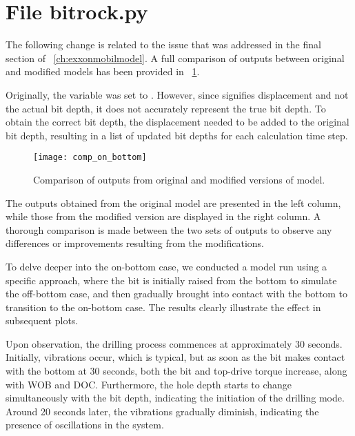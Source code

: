 \section{File {\codefont bitrock.py}}
The following change is related to the issue that was addressed in the final section of \chaptername~\ref{ch:exxonmobilmodel}.
A full comparison of outputs between original and modified models has been provided in \figurename~\ref{Comaprison_on_bottom}.
\begin{codemodifications}

\begin{codemodification}{29}
Originally, the variable  was set to . However, since  signifies displacement and not the actual bit depth, it does not accurately represent the true bit depth. To obtain the correct bit depth, the displacement needed to be added to the original bit depth, resulting in a list of updated bit depths for each calculation time step.
\end{codemodification}

\end{codemodifications} 

\begin{figure}
  \centering
  \texttt{[image: comp\_on\_bottom]}
  \caption[Output comparison]{Comparison of outputs from original and modified versions of model.}\label{Comaprison_on_bottom}
\end{figure}

The outputs obtained from the original model are presented in the left column, while those from the modified version are displayed in the right column. A thorough comparison is made between the two sets of outputs to observe any differences or improvements resulting from the modifications. 

To delve deeper into the on-bottom case, we conducted a model run using a specific approach, where the bit is initially raised from the bottom to simulate the off-bottom case, and then gradually brought into contact with the bottom to transition to the on-bottom case. The results clearly illustrate the effect in subsequent plots.

Upon observation, the drilling process commences at approximately 30 seconds. Initially, vibrations occur, which is typical, but as soon as the bit makes contact with the bottom at 30 seconds, both the bit and top-drive torque increase, along with WOB and DOC. Furthermore, the hole depth starts to change simultaneously with the bit depth, indicating the initiation of the drilling mode. Around 20 seconds later, the vibrations gradually diminish, indicating the presence of oscillations in the system.
